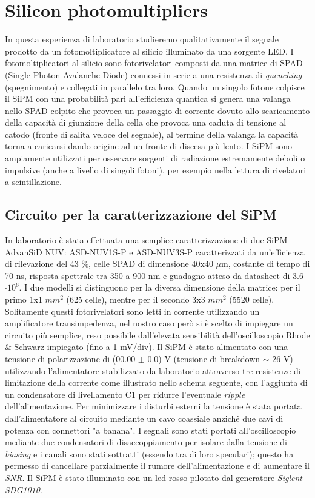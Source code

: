 \documentclass[journal]{IEEEtran}
\begin{document}

\section{Silicon photomultipliers} %
In questa esperienza di laboratorio studieremo qualitativamente il segnale prodotto da un fotomoltiplicatore al silicio illuminato da una sorgente LED. I fotomoltiplicatori al silicio sono fotorivelatori composti da una matrice di SPAD (Single Photon Avalanche Diode) connessi in serie a una resistenza di \textit{quenching} (spegnimento) e collegati in parallelo tra loro. Quando un singolo fotone colpisce il SiPM con una probabilità pari all'efficienza quantica si genera una valanga nello SPAD colpito che provoca un passaggio di corrente dovuto allo scaricamento della capacità di giunzione della cella che provoca una caduta di tensione al catodo (fronte di salita veloce del segnale), al termine della valanga la capacità torna a caricarsi dando origine ad un fronte di discesa più lento. I SiPM sono ampiamente utilizzati per osservare sorgenti di radiazione estremamente deboli o impulsive (anche a livello di singoli fotoni), per esempio nella lettura di rivelatori a scintillazione.

\subsection{Circuito per la caratterizzazione del SiPM}
In laboratorio è stata effettuata una semplice caratterizzazione di due SiPM AdvanSiD NUV: ASD-NUV1S-P e ASD-NUV3S-P caratterizzati da un'efficienza di rilevazione del 43 \%, celle SPAD di dimensione 40x40 $\mu$m, costante di tempo di 70 ns, risposta spettrale tra 350 a 900 nm e guadagno atteso da datasheet di 3.6 $\cdot 10^6$. I due modelli si distinguono per la diversa dimensione della matrice: per il primo 1x1 $mm^2$ (625 celle), mentre per il secondo 3x3 $mm^2$ (5520 celle). Solitamente questi fotorivelatori sono letti in corrente utilizzando un amplificatore transimpedenza, nel nostro caso però si è scelto di impiegare un circuito più semplice, reso possibile dall'elevata sensibilità dell'oscilloscopio Rhode & Schwarz impiegato (fino a 1 mV/div). Il SiPM è stato alimentato con una tensione di polarizzazione di (00.00 $\pm$ 0.0) V (tensione di breakdown $\sim$ 26 V) utilizzando l'alimentatore stabilizzato da laboratorio attraverso tre resistenze di limitazione della corrente come illustrato nello schema seguente, con l'aggiunta di un condensatore di livellamento C1 per ridurre l'eventuale \textit{ripple} dell'alimentazione. Per minimizzare i disturbi esterni la tensione è stata portata dall'alimentatore al circuito mediante un cavo coassiale anziché due cavi di potenza con connettori "a banana". I segnali sono stati portati all'oscilloscopio mediante due condensatori di disaccoppiamento per isolare dalla tensione di \textit{biasing} e i canali sono stati sottratti (essendo tra di loro speculari); questo ha permesso di cancellare parzialmente il rumore dell'alimentazione e di aumentare il \textit{SNR}. Il SiPM è stato illuminato con un led rosso pilotato dal generatore \textit{Siglent SDG1010}.
\end{document}
